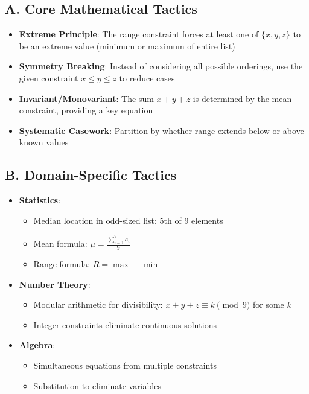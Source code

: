 \documentclass[11pt]{article}
\begin{document}
\begin{tacticalbox}
\subsection*{A. Core Mathematical Tactics}
\begin{itemize}[leftmargin=*]
    \item \textbf{Extreme Principle}: The range constraint forces at least one of $\{x, y, z\}$ to be an extreme value (minimum or maximum of entire list)
    
    \item \textbf{Symmetry Breaking}: Instead of considering all possible orderings, use the given constraint $x \leq y \leq z$ to reduce cases
    
    \item \textbf{Invariant/Monovariant}: The sum $x + y + z$ is determined by the mean constraint, providing a key equation
    
    \item \textbf{Systematic Casework}: Partition by whether range extends below or above known values
\end{itemize}

\subsection*{B. Domain-Specific Tactics}
\begin{itemize}[leftmargin=*]
    \item \textbf{Statistics}: 
    \begin{itemize}
        \item Median location in odd-sized list: 5th of 9 elements
        \item Mean formula: $\mu = \frac{\sum_{i=1}^9 a_i}{9}$
        \item Range formula: $R = \max - \min$
    \end{itemize}
    
    \item \textbf{Number Theory}: 
    \begin{itemize}
        \item Modular arithmetic for divisibility: $x + y + z \equiv k \pmod{9}$ for some $k$
        \item Integer constraints eliminate continuous solutions
    \end{itemize}
    
    \item \textbf{Algebra}: 
    \begin{itemize}
        \item Simultaneous equations from multiple constraints
        \item Substitution to eliminate variables
    \end{itemize}
\end{itemize}


\end{tacticalbox}
\end{document}
